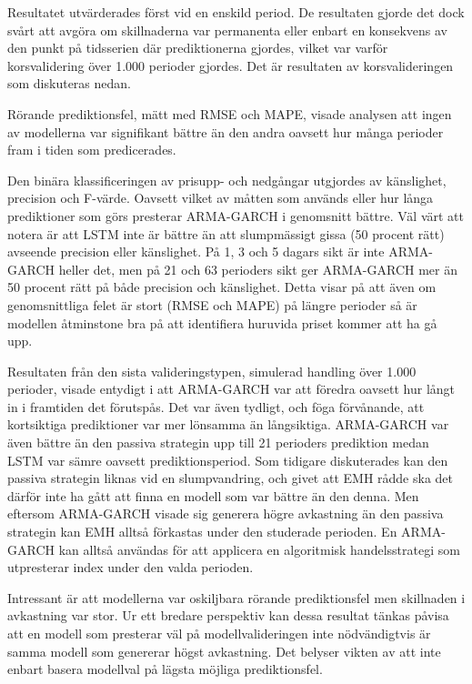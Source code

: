 \documentclass[11pt]{article}
\numberwithin{equation}{section}
\numberwithin{table}{section}
\numberwithin{figure}{section}
\begin{document}
Resultatet utvärderades först vid en enskild period. De resultaten gjorde det dock svårt att avgöra om skillnaderna var permanenta eller enbart en konsekvens av den punkt på tidsserien där prediktionerna gjordes, vilket var varför korsvalidering över 1.000 perioder gjordes. Det är resultaten av korsvalideringen som diskuteras nedan.

Rörande prediktionsfel, mätt med RMSE och MAPE, visade analysen att ingen av modellerna var signifikant bättre än den andra oavsett hur många perioder fram i tiden som predicerades.



Den binära klassificeringen av prisupp- och nedgångar utgjordes av känslighet, precision och F-värde. Oavsett vilket av måtten som används eller hur långa prediktioner som görs presterar ARMA-GARCH i genomsnitt bättre. Väl värt att notera är att LSTM inte är bättre än att slumpmässigt gissa (50 procent rätt) avseende precision eller känslighet. På 1, 3 och 5 dagars sikt är inte ARMA-GARCH heller det, men på 21 och 63 perioders sikt ger ARMA-GARCH mer än 50 procent rätt på både precision och känslighet. Detta visar på att även om genomsnittliga felet är stort (RMSE och MAPE) på längre perioder så är modellen åtminstone bra på att identifiera huruvida priset kommer att ha gå upp. 

Resultaten från den sista valideringstypen, simulerad handling över 1.000 perioder, visade entydigt i att ARMA-GARCH var att föredra oavsett hur långt in i framtiden det förutspås. Det var även tydligt, och föga förvånande, att kortsiktiga prediktioner var mer lönsamma än långsiktiga. ARMA-GARCH var även bättre än den passiva strategin upp till 21 perioders prediktion medan LSTM var sämre oavsett prediktionsperiod. Som tidigare diskuterades kan den passiva strategin liknas vid en slumpvandring, och givet att EMH rådde ska det därför inte ha gått att finna en modell som var bättre än den denna. Men eftersom ARMA-GARCH visade sig generera högre avkastning än den passiva strategin kan EMH alltså förkastas under den studerade perioden. En ARMA-GARCH kan alltså användas för att applicera en algoritmisk handelsstrategi som utpresterar index under den valda perioden. 

Intressant är att modellerna var oskiljbara rörande prediktionsfel men skillnaden i avkastning var stor. Ur ett bredare perspektiv kan dessa resultat tänkas påvisa att en modell som presterar väl på modellvalideringen inte nödvändigtvis är samma modell som genererar högst avkastning. Det belyser vikten av att inte enbart basera modellval på lägsta möjliga prediktionsfel. 
\end{document}
